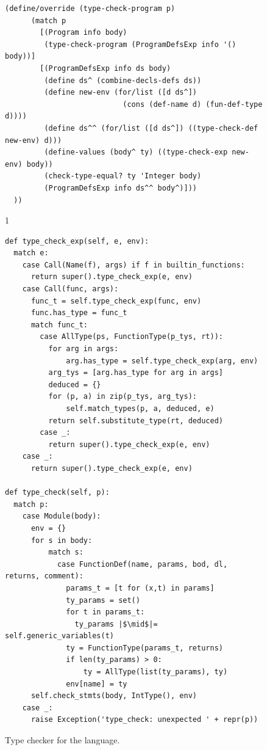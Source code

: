 \documentclass[7x10]{TimesAPriori_MIT}%
\def\pythonEd{1}
\def\edition{1}
\newcommand{\pythonColor}[0]{}
\numberwithin{theorem}{chapter}
\numberwithin{definition}{chapter}
\numberwithin{equation}{chapter}
\begin{document}
\begin{figure}[tbp]
\begin{tcolorbox}[colback=white]
{\begin{lstlisting}[basicstyle=\ttfamily\scriptsize]
    (define/override (type-check-program p)
      (match p
        [(Program info body)
         (type-check-program (ProgramDefsExp info '() body))]
        [(ProgramDefsExp info ds body)
         (define ds^ (combine-decls-defs ds))
         (define new-env (for/list ([d ds^])
                           (cons (def-name d) (fun-def-type d))))
         (define ds^^ (for/list ([d ds^]) ((type-check-def new-env) d)))
         (define-values (body^ ty) ((type-check-exp new-env) body))
         (check-type-equal? ty 'Integer body)
         (ProgramDefsExp info ds^^ body^)]))
  ))
\end{lstlisting}
\fi}
{\if\edition\pythonEd\pythonColor
\begin{lstlisting}[basicstyle=\ttfamily\small]
def type_check_exp(self, e, env):
  match e:
    case Call(Name(f), args) if f in builtin_functions:
      return super().type_check_exp(e, env)      
    case Call(func, args):
      func_t = self.type_check_exp(func, env)
      func.has_type = func_t
      match func_t:
        case AllType(ps, FunctionType(p_tys, rt)):
          for arg in args:
              arg.has_type = self.type_check_exp(arg, env)
          arg_tys = [arg.has_type for arg in args]
          deduced = {}
          for (p, a) in zip(p_tys, arg_tys):
              self.match_types(p, a, deduced, e)
          return self.substitute_type(rt, deduced)
        case _:
          return super().type_check_exp(e, env)
    case _:
      return super().type_check_exp(e, env)

def type_check(self, p):
  match p:
    case Module(body):
      env = {}
      for s in body:
          match s:
            case FunctionDef(name, params, bod, dl, returns, comment):
              params_t = [t for (x,t) in params]
              ty_params = set()
              for t in params_t:
                ty_params |$\mid$|= self.generic_variables(t)
              ty = FunctionType(params_t, returns)
              if len(ty_params) > 0:
                  ty = AllType(list(ty_params), ty)
              env[name] = ty
      self.check_stmts(body, IntType(), env)
    case _:
      raise Exception('type_check: unexpected ' + repr(p))
\end{lstlisting}
\fi}
\end{tcolorbox}

\caption{Type checker for the \LangPoly{} language.}
\label{fig:type-check-Lpoly}
\end{figure}
\end{document}
